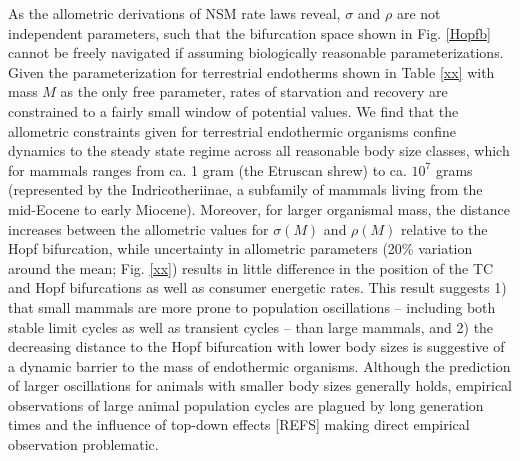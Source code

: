 \documentclass{pnastwo}
\begin{document}
\begin{article}
As the allometric derivations of NSM rate laws reveal, $\sigma$ and $\rho$ are not independent parameters, such that the bifurcation space shown in Fig. \ref{Hopfb} cannot be freely navigated if assuming biologically reasonable parameterizations.
Given the parameterization for terrestrial endotherms shown in Table \ref{xx} with mass $M$ as the only free parameter, rates of starvation and recovery are constrained to a fairly small window of potential values.
We find that the allometric constraints given for terrestrial endothermic organisms confine dynamics to the steady state regime across all reasonable body size classes, which for mammals ranges from ca. 1 gram (the Etruscan shrew) to ca. $10^7$ grams (represented by the Indricotheriinae, a subfamily of mammals living from the mid-Eocene to early Miocene).
Moreover, for larger organismal mass, the distance increases between the allometric values for $\sigma(M)$ and $\rho(M)$ relative to the Hopf bifurcation, while uncertainty in allometric parameters (20\% variation around the mean; Fig. \ref{xx}) results in little difference in the position of the TC and Hopf bifurcations as well as consumer energetic rates.
This result suggests 
1) that small mammals are more prone to population oscillations -- including both stable limit cycles as well as transient cycles -- than large mammals, and
2) the decreasing distance to the Hopf bifurcation with lower body sizes is suggestive of a dynamic barrier to the mass of endothermic organisms.
Although the prediction of larger oscillations for animals with smaller body sizes generally holds, empirical observations of large animal population cycles are plagued by long generation times and the influence of top-down effects [REFS] making direct empirical observation problematic.





\end{article}
\end{document}
